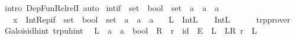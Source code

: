 \begin{isabellebody}
\ {\isacharparenleft}{\kern0pt}intro\ Dep{\isacharunderscore}{\kern0pt}Fun{\isacharunderscore}{\kern0pt}Rel{\isacharunderscore}{\kern0pt}relI{\isacharparenright}{\kern0pt}\ auto%
\endisatagproof
{\isafoldproof}%
%
\isadelimproof
\isanewline
%
\endisadelimproof
\isanewline
{}\isamarkupfalse%
\ int{\isacharunderscore}{\kern0pt}if\ {\isacharcolon}{\kern0pt}{\isacharcolon}{\kern0pt}\ {\isachardoublequoteopen}{\isacharparenleft}{\kern0pt}set\ {\isasymRightarrow}\ bool{\isacharparenright}{\kern0pt}\ {\isasymRightarrow}\ set\ {\isasymRightarrow}\ {\isacharprime}{\kern0pt}a\ {\isasymRightarrow}\ {\isacharprime}{\kern0pt}a\ {\isasymRightarrow}\ {\isacharprime}{\kern0pt}a{\isachardoublequoteclose}\isanewline
\ \ \ x\ {\isacharequal}{\kern0pt}\ {\isachardoublequoteopen}Int{\isacharunderscore}{\kern0pt}Rep{\isacharunderscore}{\kern0pt}if\ {\isacharcolon}{\kern0pt}{\isacharcolon}{\kern0pt}\ {\isacharparenleft}{\kern0pt}set\ {\isasymRightarrow}\ bool{\isacharparenright}{\kern0pt}\ {\isasymRightarrow}\ set\ {\isasymRightarrow}\ {\isacharprime}{\kern0pt}a\ {\isasymRightarrow}\ {\isacharprime}{\kern0pt}a\ {\isasymRightarrow}\ {\isacharprime}{\kern0pt}a{\isachardoublequoteclose}\isanewline
\ \ \ L\ {\isacharequal}{\kern0pt}\ {\isachardoublequoteopen}{\isacharparenleft}{\kern0pt}Int{\isachardot}{\kern0pt}L\ {\isasymRrightarrow}\ {\isacharparenleft}{\kern0pt}{\isasymlongleftrightarrow}{\isacharparenright}{\kern0pt}{\isacharparenright}{\kern0pt}\ {\isasymRrightarrow}\ Int{\isachardot}{\kern0pt}L\ {\isasymRrightarrow}\ {\isacharparenleft}{\kern0pt}{\isacharequal}{\kern0pt}{\isacharparenright}{\kern0pt}{\isachardoublequoteclose}\isanewline
%
\isadelimproof
\ \ %
\endisadelimproof
%
\isatagproof
{}\isamarkupfalse%
\ trp{\isacharunderscore}{\kern0pt}prover%
\endisatagproof
{\isafoldproof}%
%
\isadelimproof
\isanewline
%
\endisadelimproof
\isanewline
{}\isamarkupfalse%
\ Galois{\isacharunderscore}{\kern0pt}id{\isacharunderscore}{\kern0pt}hint\ {\isacharbrackleft}{\kern0pt}trp{\isacharunderscore}{\kern0pt}uhint{\isacharbrackright}{\kern0pt}{\isacharcolon}{\kern0pt}\isanewline
\ \ {\isachardoublequoteopen}{\isacharparenleft}{\kern0pt}L\ {\isacharcolon}{\kern0pt}{\isacharcolon}{\kern0pt}\ {\isacharprime}{\kern0pt}a\ {\isasymRightarrow}\ {\isacharprime}{\kern0pt}a\ {\isasymRightarrow}\ bool{\isacharparenright}{\kern0pt}\ {\isasymequiv}\ R\ {\isasymLongrightarrow}\ r\ {\isasymequiv}\ id\ {\isasymLongrightarrow}\ E\ {\isasymequiv}\ L\ {\isasymLongrightarrow}\ {\isacharparenleft}{\kern0pt}\isactrlbsub L\isactrlesub {\isasymlessapprox}\isactrlbsub R\ r\isactrlesub {\isacharparenright}{\kern0pt}\ {\isasymequiv}\ L{\isachardoublequoteclose}\isanewline

\end{isabellebody}
